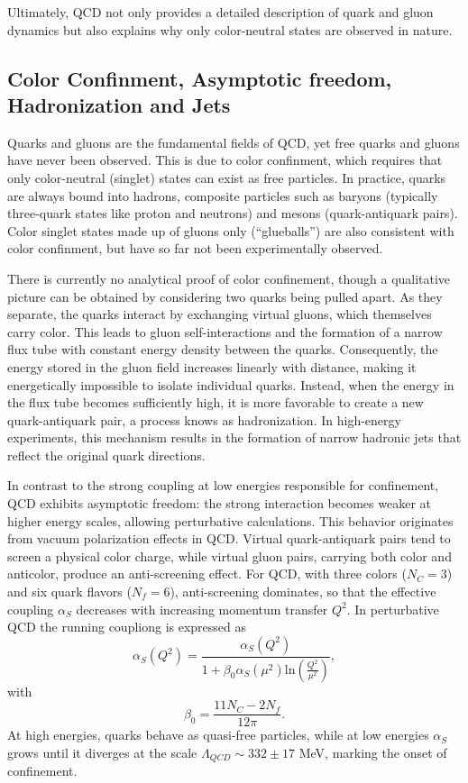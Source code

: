 Ultimately, QCD not only provides a detailed description of quark and gluon dynamics but also explains why only color-neutral states are observed in nature. 


\subsection{Color Confinment, Asymptotic freedom, Hadronization and Jets}
\label{subsec:confinment}


Quarks and gluons are the fundamental fields of QCD, yet free quarks and gluons have never been observed. This is due to color confinment, which requires that only color-neutral (singlet) states can exist as free particles. In practice, quarks are always bound into hadrons, composite particles such as baryons (typically three-quark states like proton and neutrons) and mesons (quark-antiquark pairs). Color singlet states made up of gluons only (``glueballs'') are also consistent with color confinment, but have so far not been experimentally observed.

There is currently no analytical proof of color confinement, though a qualitative picture can be obtained by considering two quarks being pulled apart. As they separate, the quarks interact by exchanging virtual gluons, which themselves carry color. This leads to gluon self-interactions and the formation of a narrow flux tube with constant energy density between the quarks. Consequently, the energy stored in the gluon field increases linearly with distance, making it energetically impossible to isolate individual quarks. Instead, when the energy in the flux tube becomes sufficiently high, it is more favorable to create a new quark-antiquark pair, a process knows as hadronization. In high-energy experiments, this mechanism results in the formation of narrow hadronic jets that reflect the original quark directions.

In contrast to the strong coupling at low energies responsible for confinement, QCD exhibits asymptotic freedom: the strong interaction becomes weaker at higher energy scales, allowing perturbative calculations. This behavior originates from vacuum polarization effects in QCD. Virtual quark-antiquark pairs tend to screen a physical color charge, while virtual gluon pairs, carrying both color and anticolor, produce an anti-screening effect. For QCD, with three colors ($N_C=3$) and six quark flavors ($N_f=6$), anti-screening dominates, so that the effective coupling $\alpha_S$ decreases with increasing momentum transfer $Q^2$. In perturbative QCD the running coupliong is expressed as
\begin{equation}
\alpha_S(Q^2)=\frac{\alpha_S(Q^2)}{1+\beta_0\alpha_S(\mu^2)\mathrm{ln}\left( \frac{Q^2}{\mu^2}\right)},
\end{equation}
with
\begin{equation}
\beta_0=\frac{11N_C -2N_f}{12\pi}.
\end{equation}
At high energies, quarks behave as quasi-free particles, while at low energies $\alpha_S$ grows until it diverges at the scale $\Lambda_{QCD} \sim 332 \pm 17$ MeV, marking the onset of confinement.

